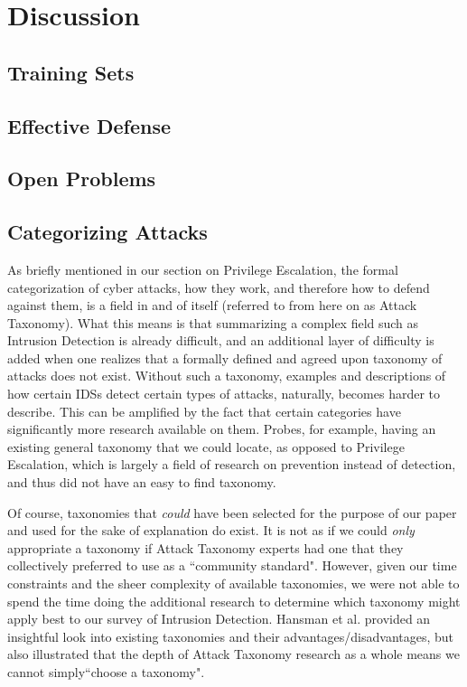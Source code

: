 \documentclass{acm_proc_article-sp}
\begin{document}
\section{Discussion}
    \subsection{Training Sets}
    \subsection{Effective Defense}
    \subsection{Open Problems}
    \subsection{Categorizing Attacks} %
    	As briefly mentioned in our section on Privilege Escalation, the formal categorization of cyber attacks, how they work, and therefore how to defend against them, is a field in and of itself (referred to from here on as Attack Taxonomy). What this means is that summarizing a complex field such as Intrusion Detection is already difficult, and an additional layer of difficulty is added when one realizes that a formally defined and agreed upon taxonomy of attacks does not exist. Without such a taxonomy, examples and descriptions of how certain IDSs detect certain types of attacks, naturally, becomes harder to describe. This can be amplified by the fact that certain categories have significantly more research available on them. Probes, for example, having an existing general taxonomy that we could locate, as opposed to Privilege Escalation, which is largely a field of research on prevention instead of detection, and thus did not have an easy to find taxonomy. 
    	
    	Of course, taxonomies that \emph{could} have been selected for the purpose of our paper and used for the sake of explanation do exist. It is not as if we could \emph{only} appropriate a taxonomy if Attack Taxonomy experts had one that they collectively preferred to use as a ``community standard". However, given our time constraints and the sheer complexity of available taxonomies, we were not able to spend the time doing the additional research to determine which taxonomy might apply best to our survey of Intrusion Detection. Hansman et al. \cite{Hansman2005} provided an insightful look into existing taxonomies and their advantages/disadvantages, but also illustrated that the depth of Attack Taxonomy research as a whole means we cannot simply``choose a taxonomy". 
    	
\end{document}
